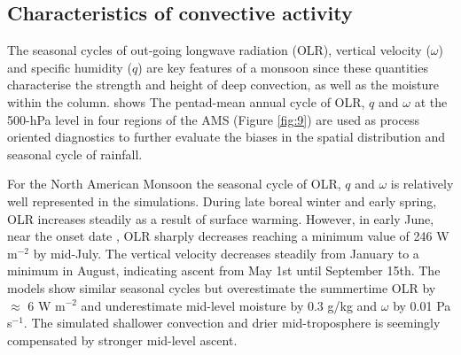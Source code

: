 \subsection{Characteristics of convective activity}




The seasonal cycles of out-going longwave radiation (OLR), vertical velocity ($\omega$) and specific humidity ($q$) are key features of a monsoon since these quantities characterise the strength and height of deep convection, as well as the moisture within the column.
 shows The pentad-mean annual cycle of OLR, $q$ and $\omega$ at the 500-hPa level in four regions of the AMS (Figure \ref{fig:9}) are used as process oriented diagnostics to further evaluate the biases in the spatial distribution and seasonal cycle of rainfall.
 

For the North American Monsoon the seasonal cycle of OLR, $q$ and $\omega$ is relatively well represented in the simulations.
During late boreal winter and early spring, OLR increases steadily as a result of surface warming.
However, in early June, near the onset date \citep{douglas1993,geil2013}, OLR sharply decreases reaching a minimum value of 246 W m$^{-2}$ by mid-July.
The vertical velocity decreases steadily from January to a minimum in August, indicating ascent from May 1st until September 15th.
 The models show similar seasonal cycles but overestimate the summertime OLR by $\approx$ 6 W m$^{-2}$ and underestimate mid-level moisture by 0.3 g/kg and $\omega$ by 0.01 Pa s$^{-1}$. 
The simulated shallower convection and drier mid-troposphere is seemingly compensated by stronger mid-level ascent.

